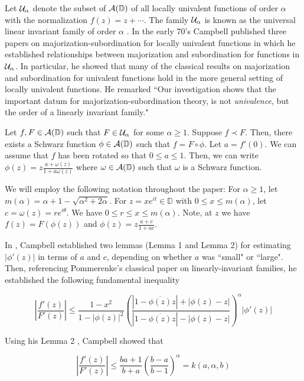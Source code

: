 \documentclass[12pt]{article}
\newcommand{\cA}{{\cal{A}}}
\newcommand{\cU}{{\cal{U}}}
\newcommand{\D}{{\mathbb D}}
\newcommand{\ds}{\displaystyle}
\begin{document}
Let $\cU_\alpha$ denote the subset of $\cA(\D)$ of all locally univalent
functions of order $\alpha$ with the normalization $f(z) = z+ \cdots$.
The family $\cU_\alpha$ is known as the universal linear invariant family of 
order $\alpha$ \cite{Pom01}.  In the early 70's Campbell published three papers 
on majorization-subordination for locally univalent functions \cite{DMC01,DMC02,DMC03}
in which he established relationships between majorization and subordination for functions
in $\cU_\alpha$.  In particular, he showed that many of the classical results on 
majorization and subordination for univalent functions hold in the more general setting 
of locally univalent functions.  He remarked ``Our investigation shows that 
the important datum for majorization-subordination theory, is not 
\emph{univalence}, but the order of a linearly invariant family."


Let $f,F \in \cA(\D)$ such that $F \in \cU_\alpha$ for some $\alpha \ge 1$.
Suppose $f \prec F$.  Then, there exists a Schwarz function $\phi \in \cA(\D)$ such that 
$f=F\circ\phi$. Let $a = f'(0)$.  We can 
assume that $f$ has been rotated so that $0 \le a \le 1$.  Then, we can write
${\ds \phi(z)=z\frac{a+\omega(z)}{1+a\omega(z)}}$ where $\omega \in \cA(\D)$ such that 
$\omega$ is a Schwarz function.

We will employ the following notation throughout the paper: For $\alpha \ge 1$, let 
$m(\alpha) = \alpha+1 - \sqrt{\alpha^2 + 2\alpha}$. For $z = xe^{it} \in \D$ 
with $0 \le x \le m(\alpha)$, let $c= \omega(z) = re^{i\theta}$.  We have 
$0 \le r \le x \le m(\alpha)$.  Note, at $z$ we have $f(z)=F(\phi(z))$ and 
${\ds \phi(z)= z\frac{a+c}{1+ac}}$.  


In \cite{DMC03}, Campbell established two lemmas (Lemma 1 and Lemma 2) for estimating $|\phi'(z)|$ in terms of $a$ and $c$, 
depending on whether $a$ was ``small" or ``large".  Then, referencing Pommerenke's classical paper \cite{Pom01}
on linearly-invariant families, he established the following fundamental inequality

\begin{equation} \label{fund}
\left | \frac{f'(z)}{F'(z)}\right | \le \frac{1-x^2}{1-|\phi(z)|^2}
\left( \frac{|1-\overline{\phi(z)}z|+|\phi(z)-z|}{|1-\overline{\phi(z)}z|-|\phi(z)-z|} \right ) ^\alpha
|\phi'(z)|
\end{equation}

Using his Lemma 2 \cite{DMC03}, Campbell showed that

\begin{equation} \label{fund-2}
\left | \frac{f'(z)}{F'(z)} \right | \le \frac{ba+1}{b+a} \left ( \frac{b-a}{b-1} \right ) ^ \alpha = k(a,\alpha,b)
\end{equation}
\end{document}
